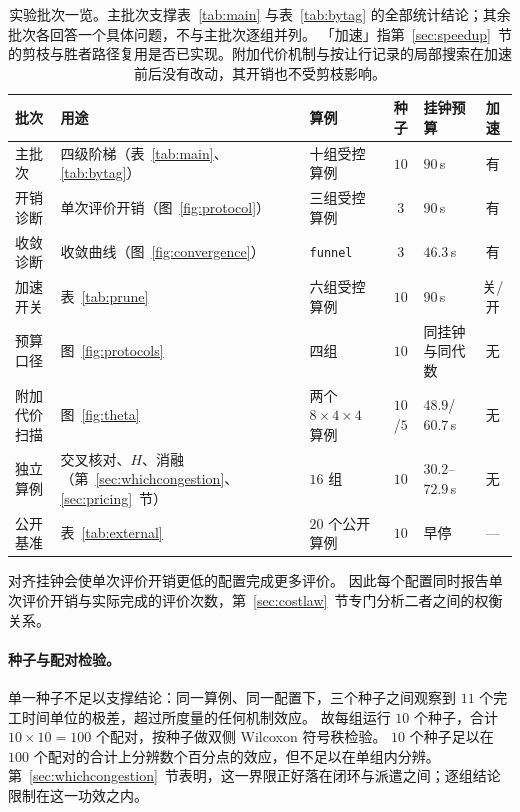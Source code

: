 \documentclass[manuscript,screen,review]{acmart}
\newcommand{\NCases}{10}
\newcommand{\NSeeds}{10}
\newcommand{\NPairs}{100}
\newcommand{\MatrixCells}{16}
\newcommand{\PubNInst}{20}
\begin{document}
\begin{table}[t]
\caption{实验批次一览。主批次支撑表~\ref{tab:main} 与表~\ref{tab:bytag} 的全部统计结论；其余批次各回答一个具体问题，不与主批次逐组并列。
「加速」指第~\ref{sec:speedup}~节的剪枝与胜者路径复用是否已实现。附加代价机制与按让行记录的局部搜索在加速前后没有改动，其开销也不受剪枝影响。}
\label{tab:batches}
\footnotesize
\begin{tabular}{@{}p{1.7cm}p{2.3cm}p{1.9cm}cp{1.6cm}c@{}}
\toprule
批次 & 用途 & 算例 & 种子 & 挂钟预算 & 加速 \\
\midrule
主批次 & 四级阶梯（表~\ref{tab:main}、\ref{tab:bytag}） & 十组受控算例 & $\NSeeds$ & $90$\,s & 有 \\
开销诊断 & 单次评价开销（图~\ref{fig:protocol}） & 三组受控算例 & $3$ & $90$\,s & 有 \\
收敛诊断 & 收敛曲线（图~\ref{fig:convergence}） & \texttt{funnel} & $3$ & $46.3$\,s & 有 \\
加速开关 & 表~\ref{tab:prune} & 六组受控算例 & $10$ & $90$\,s & 关/开 \\
预算口径 & 图~\ref{fig:protocols} & 四组 & $10$ & 同挂钟与同代数 & 无 \\
附加代价扫描 & 图~\ref{fig:theta} & 两个 $8\times4\times4$ 算例 & $10$/$5$ & $48.9$/$60.7$\,s & 无 \\
独立算例 & 交叉核对、$H$、消融（第~\ref{sec:whichcongestion}、\ref{sec:pricing}~节） & $\MatrixCells$ 组 & $10$ & $30.2$--$72.9$\,s & 无 \\
公开基准 & 表~\ref{tab:external} & $\PubNInst$ 个公开算例 & $\NSeeds$ & 早停 & --- \\
\bottomrule
\end{tabular}
\end{table}

对齐挂钟会使单次评价开销更低的配置完成更多评价。
因此每个配置同时报告单次评价开销与实际完成的评价次数，第~\ref{sec:costlaw}~节专门分析二者之间的权衡关系。

\paragraph{种子与配对检验。}
单一种子不足以支撑结论：同一算例、同一配置下，三个种子之间观察到 $11$ 个完工时间单位的极差，超过所度量的任何机制效应。
故每组运行 $\NSeeds$ 个种子，合计 $\NCases\times\NSeeds=\NPairs$ 个配对，按种子做双侧 Wilcoxon 符号秩检验。
$\NSeeds$ 个种子足以在 $\NPairs$ 个配对的合计上分辨数个百分点的效应，但不足以在单组内分辨。
第~\ref{sec:whichcongestion}~节表明，这一界限正好落在闭环与派遣之间；逐组结论限制在这一功效之内。
\end{document}
